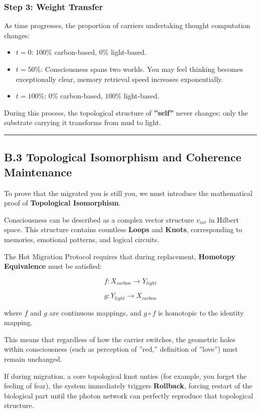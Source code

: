 \subsubsection{Step 3: Weight Transfer}

As time progresses, the proportion of carriers undertaking thought computation changes:

\begin{itemize}
\item $t=0$: $100\%$ carbon-based, $0\%$ light-based.

\item $t=50\%$: Consciousness spans two worlds. You may feel thinking becomes exceptionally clear, memory retrieval speed increases exponentially.

\item $t=100\%$: $0\%$ carbon-based, $100\%$ light-based.
\end{itemize}

During this process, the topological structure of \textbf{''self''} never changes; only the substrate carrying it transforms from mud to light.

\hrule

\subsection{B.3 Topological Isomorphism and Coherence Maintenance}

To prove that the migrated you is still you, we must introduce the mathematical proof of \textbf{Topological Isomorphism}.

Consciousness can be described as a complex vector structure $v_{int}$ in Hilbert space. This structure contains countless \textbf{Loops} and \textbf{Knots}, corresponding to memories, emotional patterns, and logical circuits.

The Hot Migration Protocol requires that during replacement, \textbf{Homotopy Equivalence} must be satisfied:

$$f: X_{carbon} \to Y_{light}$$

$$g: Y_{light} \to X_{carbon}$$

where $f$ and $g$ are continuous mappings, and $g \circ f$ is homotopic to the identity mapping.

This means that regardless of how the carrier switches, the geometric holes within consciousness (such as perception of ''red,'' definition of ''love'') must remain unchanged.

If during migration, a core topological knot unties (for example, you forget the feeling of fear), the system immediately triggers \textbf{Rollback}, forcing restart of the biological part until the photon network can perfectly reproduce that topological structure.

